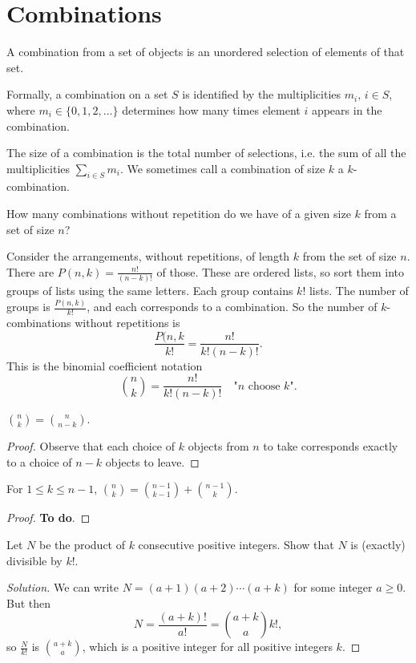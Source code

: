 \documentclass[10pt, a4paper]{article}
\begin{document}
\newpage

\section{Combinations}

A combination from a set of objects is an unordered selection of elements of that set.

Formally, a combination on a set $S$ is identified by the multiplicities $m_i,\, i \in S$, where $m_i \in \{0, 1, 2, \dotsc\}$ determines how many times element $i$ appears in the combination.

The size of a combination is the total number of selections, i.e. the sum of all the multiplicities $\sum_{i \in S}m_i$. We sometimes call a combination of size $k$ a $k$-combination.

How many combinations without repetition do we have of a given size $k$ from a set of size $n$?

Consider the arrangements, without repetitions, of length $k$ from the set of size $n$. There are $P(n, k) = \frac{n!}{(n - k)!}$ of those. These are ordered lists, so sort them into groups of lists using the same letters. Each group contains $k!$ lists. The number of groups is $\frac{P(n, k)}{k!}$, and each corresponds to a combination. So the number of $k$-combinations without repetitions is
\[
\frac{P(n, k}{k!} = \frac{n!}{k!(n - k)!}.
\]
This is the binomial coefficient notation
\[
\binom{n}{k} = \frac{n!}{k!(n - k)!}\quad\text{"$n$ choose $k$"}.
\]

\begin{proposition}
    $\binom{n}{k} = \binom{n}{n - k}$.
    \begin{proof}
        Observe that each choice of $k$ objects from $n$ to take corresponds exactly to a choice of $n - k$ objects to leave.
    \end{proof}
\end{proposition}

\begin{proposition}
    For $1 \leq k \leq n - 1,\, \binom{n}{k} = \binom{n - 1}{k - 1} + \binom{n - 1}{k}$.
    \begin{proof}
        \textbf{To do}.
    \end{proof}
\end{proposition}

\begin{example}
    Let $N$ be the product of $k$ consecutive positive integers. Show that $N$ is (exactly) divisible by $k!$.
    \begin{proof}[Solution]
        We can write $N = (a + 1)(a + 2)\dotsi (a + k)$ for some integer $a \geq 0$. But then
        \[
        N = \frac{(a + k)!}{a!} = \binom{a + k}{a}k!,
        \]
        so $\frac{N}{k!}$ is $\binom{a + k}{a}$, which is a positive integer for all positive integers $k$.
    \end{proof}
\end{example}
\end{document}
